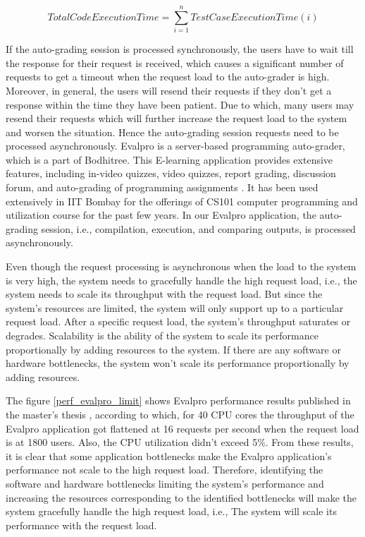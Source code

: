 \documentclass{iitbreport}
\begin{document}
\begin{equation}
  Total Code Execution Time=\sum_{i=1}^{n} Test Case Execution Time(i)
  \label{eq:test_case_execution}
\end{equation}


If the auto-grading session is processed synchronously, the users have to wait till the response for their request is received, which causes a significant number of requests to get a timeout when the request load to the auto-grader is high. Moreover, in general, the users will resend their requests if they don’t get a response within the time they have been patient. Due to which, many users may resend their requests which will further increase the request load to the system and worsen the situation. Hence the auto-grading session requests need to be processed asynchronously. Evalpro is a server-based programming auto-grader, which is a part of Bodhitree. This E-learning application provides extensive features, including in-video quizzes, video quizzes, report grading, discussion forum, and auto-grading of programming assignments \cite{anshul_mtp_thesis}. It has been used extensively in IIT Bombay for the offerings of CS101 computer programming and utilization course for the past few years. In our Evalpro application, the auto-grading session, i.e., compilation, execution, and comparing outputs, is processed asynchronously.


Even though the request processing is asynchronous when the load to the system is very high, the system needs to gracefully handle the high request load, i.e., the system needs to scale its throughput with the request load. But since the system's resources are limited, the system will only support up to a particular request load. After a specific request load, the system's throughput saturates or degrades. Scalability is the ability of the system to scale its performance proportionally by adding resources to the system. If there are any software or hardware bottlenecks, the system won’t scale its performance proportionally by adding resources.

The figure \ref{perf_evalpro_limit} shows Evalpro performance results published in the master’s thesis \cite{anshul_mtp_thesis}, according to which, for 40 CPU cores the throughput of the Evalpro application got flattened at 16 requests per second when the request load is at 1800 users. Also, the CPU utilization didn't exceed 5\%. From these results, it is clear that some application bottlenecks make the Evalpro application’s performance not scale to the high request load. Therefore, identifying the software and hardware bottlenecks limiting the system's performance and increasing the resources corresponding to the identified bottlenecks will make the system gracefully handle the high request load, i.e., The system will scale its performance with the request load.
\end{document}
